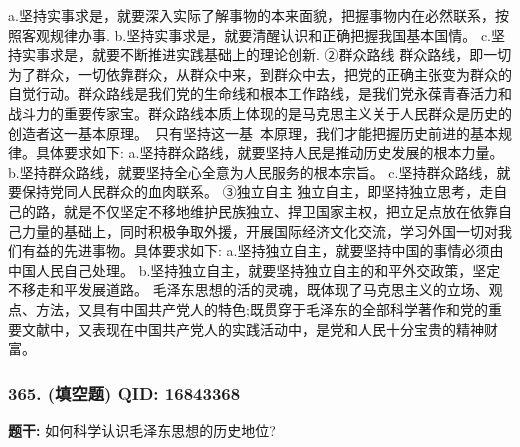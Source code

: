 \documentclass[12pt,UTF8]{ctexart}
\begin{document}
a.坚持实事求是，就要深入实际了解事物的本来面貌，把握事物内在必然联系，按照客观规律办事.
b.坚持实事求是，就要清醒认识和正确把握我国基本国情。
c.坚持实事求是，就要不断推进实践基础上的理论创新.
②群众路线
群众路线，即一切为了群众，一切依靠群众，从群众中来，到群众中去，把党的正确主张变为群众的自觉行动。群众路线是我们党的生命线和根本工作路线，是我们党永葆青春活力和战斗力的重要传家宝。群众路线本质上体现的是马克思主义关于人民群众是历史的创造者这一基本原理。 只有坚持这一基 本原理，我们才能把握历史前进的基本规律。具体要求如下:
a.坚持群众路线，就要坚持人民是推动历史发展的根本力量。
b.坚持群众路线，就要坚持全心全意为人民服务的根本宗旨。
c.坚持群众路线，就要保持党同人民群众的血肉联系。
③独立自主
独立自主，即坚持独立思考，走自己的路，就是不仅坚定不移地维护民族独立、捍卫国家主权，把立足点放在依靠自己力量的基础上，同时积极争取外援，开展国际经济文化交流，学习外国一切对我们有益的先进事物。具体要求如下:
a.坚持独立自主，就要坚持中国的事情必须由中国人民自己处理。
b.坚持独立自主，就要坚持独立自主的和平外交政策，坚定不移走和平发展道路。
毛泽东思想的活的灵魂，既体现了马克思主义的立场、观点、方法，又具有中国共产党人的特色;既贯穿于毛泽东的全部科学著作和党的重要文献中，又表现在中国共产党人的实践活动中，是党和人民十分宝贵的精神财富。

\vspace{0.3em}\hrulefill\vspace{0.7em}

\subsubsection*{365. (填空题) \small QID: 16843368}

\textbf{题干:}
如何科学认识毛泽东思想的历史地位?
\end{document}
